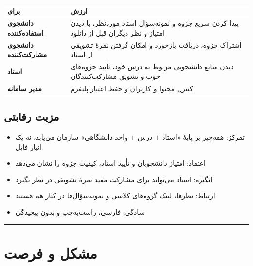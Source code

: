 \documentclass[12pt, a4paper]{article}
\begin{document}
{\def\LTcaptype{none} %
\begin{longtable}[]{@{}
  >{\raggedright\arraybackslash}p{}
  >{\raggedright\arraybackslash}p{}@{}}
\toprule\noalign{}
\begin{minipage}[b]{\linewidth}\raggedright
برای
\end{minipage} & \begin{minipage}[b]{\linewidth}\raggedright
ارزش
\end{minipage} \\
\midrule\noalign{}
\endhead
\bottomrule\noalign{}
\endlastfoot
\textbf{دانشجوی استفاده‌کننده} & پیدا کردن سریع جزوه و نمونه‌سؤال استاد موردنظر، با دیدن امتیاز و نظر دیگران قبل از دانلود \\
\textbf{دانشجوی مشارکت‌کننده} & اشتراک جزوه، دریافت بازخورد و امکان گرفتن نمرهٔ تشویقی از استاد \\
\textbf{استاد} & دیدن منابع دانشجویی مربوط به درس خود، تأیید جزوه‌های خوب و تشویق مشارکت‌کنندگان \\
\textbf{مدیر سامانه} & کنترل محتوا و کاربران و حفظ اعتبار پلتفرم \\
\end{longtable}
}

\subsection{مزیت رقابتی}

\begin{itemize}
\tightlist
\item
  تمرکز: همه‌چیز بر پایهٔ «استاد + درس + واحد دانشگاهی» سازمان می‌یابد، نه یک انبار فایل
\item
  اعتماد: امتیاز دانشجویان و تأیید استاد، کیفیت جزوه را نشان می‌دهد
\item
  انگیزه: استاد می‌تواند برای مشارکت مفید نمرهٔ تشویقی در نظر بگیرد
\item
  ارتباط: نظرها، لینک گروه‌های کلاسی و نمونه‌سؤال‌ها در کنار هم هستند
\item
  سادگی: فارسی، راست‌به‌چپ و بدون پیچیدگی
\end{itemize}

\begin{center}\rule{0.5\linewidth}{0.5pt}\end{center}

\section{مشکل و فرصت}
\end{document}
